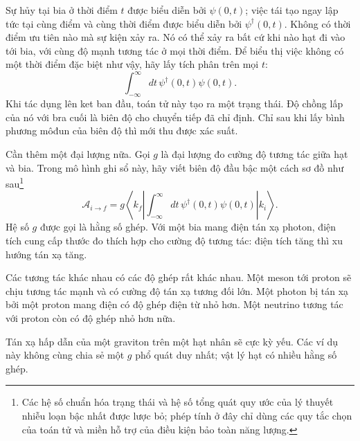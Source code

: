 Sự hủy tại bia ở thời điểm \(t\) được biểu diễn bởi \(\psi(0,t)\); việc tái tạo ngay lập tức tại cùng điểm và cùng thời điểm được biểu diễn bởi \(\psi^\dagger(0,t)\). Không có thời điểm ưu tiên nào mà sự kiện xảy ra. Nó có thể xảy ra bất cứ khi nào hạt đi vào tới bia, với cùng độ mạnh tương tác ở mọi thời điểm. Để biểu thị việc không có một thời điểm đặc biệt như vậy, hãy lấy tích phân trên mọi \(t\):
\begin{equation}
\int_{-\infty}^{\infty}dt\,\psi^\dagger(0,t)\psi(0,t).
\end{equation}
Khi tác dụng lên ket ban đầu, toán tử này tạo ra một trạng thái. Độ chồng lấp của nó với bra cuối là biên độ cho chuyển tiếp đã chỉ định. Chỉ sau khi lấy bình phương môđun của biên độ thì mới thu được xác suất.

Cần thêm một đại lượng nữa. Gọi \(g\) là đại lượng đo cường độ tương tác giữa hạt và bia. Trong mô hình ghi sổ này, hãy viết biên độ đầu bậc một cách sơ đồ như sau\footnote{Các hệ số chuẩn hóa trạng thái và hệ số tổng quát quy ước của lý thuyết nhiễu loạn bậc nhất được lược bỏ; phép tính ở đây chỉ dùng các quy tắc chọn của toán tử và miền hỗ trợ của điều kiện bảo toàn năng lượng.}
\begin{equation}
\mathcal A_{i\to f}
=g\left\langle k_f\left|
\int_{-\infty}^{\infty}dt\,
\psi^\dagger(0,t)\psi(0,t)
\right|k_i\right\rangle.
\end{equation}
Hệ số \(g\) được gọi là hằng số ghép. Với một bia mang điện tán xạ photon, điện tích cung cấp thước đo thích hợp cho cường độ tương tác: điện tích tăng thì xu hướng tán xạ tăng.

Các tương tác khác nhau có các độ ghép rất khác nhau. Một meson tới proton sẽ chịu tương tác mạnh và có cường độ tán xạ tương đối lớn. Một photon bị tán xạ bởi một proton mang điện có độ ghép điện từ nhỏ hơn. Một neutrino tương tác với proton còn có độ ghép nhỏ hơn nữa.

\begin{classroomqa}
\end{classroomqa}

Tán xạ hấp dẫn của một graviton trên một hạt nhân sẽ cực kỳ yếu. Các ví dụ này không cùng chia sẻ một \(g\) phổ quát duy nhất; vật lý hạt có nhiều hằng số ghép.

